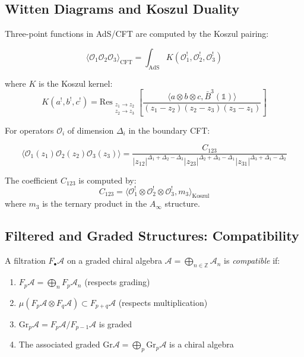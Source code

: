 \subsection{Witten Diagrams and Koszul Duality}

\begin{technique}[Witten Diagram = Koszul Pairing]
Three-point functions in AdS/CFT are computed by the Koszul pairing:

$$\langle \mathcal{O}_1 \mathcal{O}_2 \mathcal{O}_3 \rangle_{\text{CFT}} = \int_{\text{AdS}} K(\mathcal{O}_1^!, \mathcal{O}_2^!, \mathcal{O}_3^!)$$

where $K$ is the Koszul kernel:
$$K(a^!, b^!, c^!) = \text{Res}_{\substack{z_1 \to z_2 \\ z_2 \to z_3}} \left[\frac{\langle a \otimes b \otimes c, \bar{B}^3(\mathbb{1}) \rangle}{(z_1-z_2)(z_2-z_3)(z_3-z_1)}\right]$$
\end{technique}

\begin{example}
For operators $\mathcal{O}_i$ of dimension $\Delta_i$ in the boundary CFT:

$$\langle \mathcal{O}_1(z_1) \mathcal{O}_2(z_2) \mathcal{O}_3(z_3) \rangle = \frac{C_{123}}{|z_{12}|^{\Delta_1+\Delta_2-\Delta_3}|z_{23}|^{\Delta_2+\Delta_3-\Delta_1}|z_{31}|^{\Delta_3+\Delta_1-\Delta_2}}$$

The coefficient $C_{123}$ is computed by:
$$C_{123} = \langle \mathcal{O}_1^! \otimes \mathcal{O}_2^! \otimes \mathcal{O}_3^!, m_3 \rangle_{\text{Koszul}}$$
where $m_3$ is the ternary product in the $A_\infty$ structure.
\end{example}

\subsection{Filtered and Graded Structures: Compatibility}

\begin{definition}
A filtration $F_\bullet\mathcal{A}$ on a graded chiral algebra $\mathcal{A} = \bigoplus_{n \in \mathbb{Z}} \mathcal{A}_n$ is \emph{compatible} if:
\begin{enumerate}
\item $F_p\mathcal{A} = \bigoplus_{n} F_p\mathcal{A}_n$ (respects grading)
\item $\mu(F_p\mathcal{A} \otimes F_q\mathcal{A}) \subset F_{p+q}\mathcal{A}$ (respects multiplication)
\item $\text{Gr}_p\mathcal{A} = F_p\mathcal{A}/F_{p-1}\mathcal{A}$ is graded
\item The associated graded $\text{Gr}\mathcal{A} = \bigoplus_p \text{Gr}_p\mathcal{A}$ is a chiral algebra
\end{enumerate}
\end{definition}

